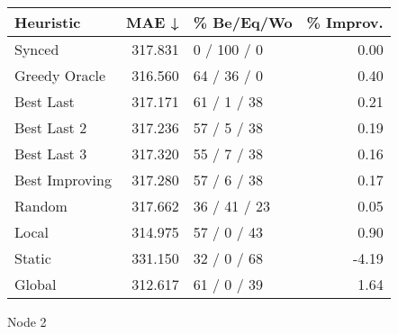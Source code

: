 \begin{tabular}{lrlr}
\toprule
\textbf{Heuristic} & \textbf{MAE ↓} & \textbf{\% Be/Eq/Wo} & \textbf{\% Improv.} \\
\midrule
            Synced &        317.831 &          0 / 100 / 0 &                0.00 \\
     Greedy Oracle &        316.560 &          64 / 36 / 0 &                0.40 \\
         Best Last &        317.171 &          61 / 1 / 38 &                0.21 \\
       Best Last 2 &        317.236 &          57 / 5 / 38 &                0.19 \\
       Best Last 3 &        317.320 &          55 / 7 / 38 &                0.16 \\
    Best Improving &        317.280 &          57 / 6 / 38 &                0.17 \\
            Random &        317.662 &         36 / 41 / 23 &                0.05 \\
             Local &        314.975 &          57 / 0 / 43 &                0.90 \\
            Static &        331.150 &          32 / 0 / 68 &               -4.19 \\
            Global &        312.617 &          61 / 0 / 39 &                1.64 \\
\bottomrule
\end{tabular}
\caption{Node 2}
\label{tab:non_lr01_le1_bs2_2}
